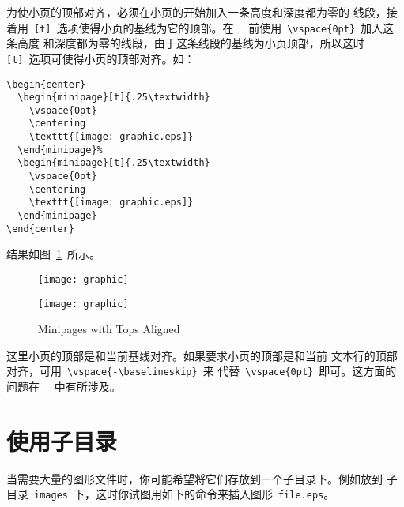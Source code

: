 为使小页的顶部对齐，必须在小页的开始加入一条高度和深度都为零的
线段，接着用~\texttt{[t]}~选项使得小页的基线为它的顶部。在
~~前使用~\verb+\vspace{0pt}+~加入这条高度
和深度都为零的线段，由于这条线段的基线为小页顶部，所以这时~
\texttt{[t]}~选项可使得小页的顶部对齐。如：
\begin{Verbatim}[xleftmargin=1cm]
\begin{center}
  \begin{minipage}[t]{.25\textwidth}
    \vspace{0pt}
    \centering
    \texttt{[image: graphic.eps]}
  \end{minipage}%
  \begin{minipage}[t]{.25\textwidth}
    \vspace{0pt}
    \centering
    \texttt{[image: graphic.eps]}
  \end{minipage}
\end{center}
\end{Verbatim}
结果如图~\ref{fig:minipagesamp-3}~所示。
\begin{figure}
\begin{center}
  \begin{minipage}[t]{.25\textwidth}
    \vspace{0pt}
    \centering
    \texttt{[image: graphic]}
  \end{minipage}%
  \begin{minipage}[t]{.25\textwidth}
    \vspace{0pt}
    \centering
    \texttt{[image: graphic]}
  \end{minipage}
\end{center}
\caption{Minipages with Tops Aligned}\label{fig:minipagesamp-3}
\end{figure}

这里小页的顶部是和当前基线对齐。如果要求小页的顶部是和当前
文本行的顶部对齐，可用~\verb+\vspace{-\baselineskip}+~来
代替~\verb+\vspace{0pt}+~即可。这方面的问题在~\cite[第~456-457~页]{Michel}~
中有所涉及。

\section{使用子目录}\label{sec:subdir}

当需要大量的图形文件时，你可能希望将它们存放到一个子目录下。例如放到
子目录~\texttt{images}~下，这时你试图用如下的命令来插入图形~\texttt{file.eps}。

